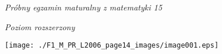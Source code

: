 \documentclass[a4paper,12pt]{article}
\begin{document}
{\it Próbny egzamin maturalny z matematyki 15}

{\it Poziom rozszerzony}
\begin{center}
\texttt{[image: ./F1\_M\_PR\_L2006\_page14\_images/image001.eps]}
\end{center}
\end{document}
